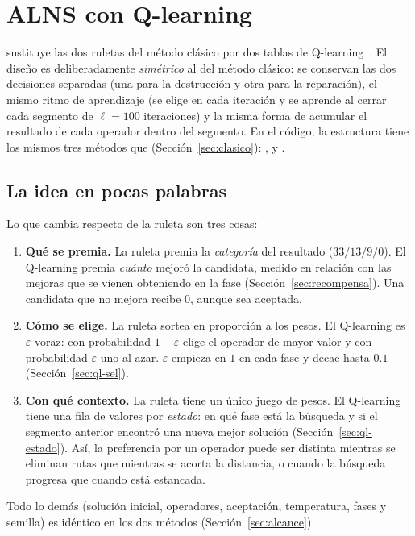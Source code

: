 \section{ALNS con Q-learning}
\label{sec:ql}

 sustituye las dos ruletas del método clásico por dos tablas de
Q-learning~\cite{watkins1992,sutton2018}. El diseño es deliberadamente \emph{simétrico} al del
método clásico: se conservan las dos decisiones separadas (una para la destrucción y otra para
la reparación), el mismo ritmo de aprendizaje (se elige en cada iteración y se aprende al
cerrar cada segmento de $\ell=100$ iteraciones) y la misma forma de acumular el resultado de
cada operador dentro del segmento. En el código, la estructura  tiene los mismos
tres métodos que  (Sección~\ref{sec:clasico}): ,  y
.

\subsection{La idea en pocas palabras}
\label{sec:ql-idea}

Lo que cambia respecto de la ruleta son tres cosas:
\begin{enumerate}
\item \textbf{Qué se premia.} La ruleta premia la \emph{categoría} del resultado
($33/13/9/0$). El Q-learning premia \emph{cuánto} mejoró la candidata, medido en relación con
las mejoras que se vienen obteniendo en la fase (Sección~\ref{sec:recompensa}). Una
candidata que no mejora recibe $0$, aunque sea aceptada.
\item \textbf{Cómo se elige.} La ruleta sortea en proporción a los pesos. El Q-learning es
$\varepsilon$-voraz: con probabilidad $1-\varepsilon$ elige el operador de mayor valor y con
probabilidad $\varepsilon$ uno al azar. $\varepsilon$ empieza en $1$ en cada fase y decae
hasta $0.1$ (Sección~\ref{sec:ql-sel}).
\item \textbf{Con qué contexto.} La ruleta tiene un único juego de pesos. El Q-learning tiene
una fila de valores por \emph{estado}: en qué fase está la búsqueda y si el segmento anterior
encontró una nueva mejor solución (Sección~\ref{sec:ql-estado}). Así, la preferencia por un
operador puede ser distinta mientras se eliminan rutas que mientras se acorta la distancia, o
cuando la búsqueda progresa que cuando está estancada.
\end{enumerate}
Todo lo demás (solución inicial, operadores, aceptación, temperatura, fases y semilla) es
idéntico en los dos métodos (Sección~\ref{sec:alcance}).

